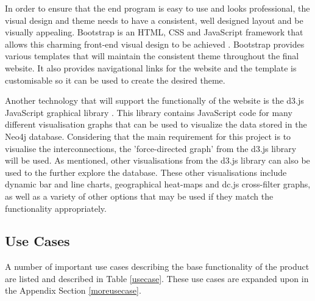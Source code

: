 \documentclass[12pt,onecolumn]{article}
\begin{document}
	In order to ensure that the end program is easy to use and looks professional, the visual design and theme needs to have a consistent, well designed layout and be visually appealing. Bootstrap is an HTML, CSS and JavaScript framework that allows this charming front-end visual design to be achieved \cite{Bootstrap}. Bootstrap provides various templates that will maintain the consistent theme throughout the final website. It also provides navigational links for the website and the template is customisable so it can be used to create the desired theme.

	Another technology that will support the functionally of the website is the d3.js JavaScript graphical library \cite{D3}. This library contains JavaScript code for many different visualisation graphs that can be used to visualize the data stored in the Neo4j database. Considering that the main requirement for this project is to visualise the interconnections, the 'force-directed graph' from the d3.js library will be used. As mentioned, other visualisations from the d3.js library can also be used to the further explore the database. These other visualisations include dynamic bar and line charts, geographical heat-maps and dc.js cross-filter graphs, as well as a variety of other options that may be used if they match the functionality appropriately.

	\subsection{Use Cases}
	A number of important use cases describing the base functionality of the product are listed and described in Table \ref{usecase}. These use cases are expanded upon in the Appendix Section \ref{moreusecase}.
\end{document}
